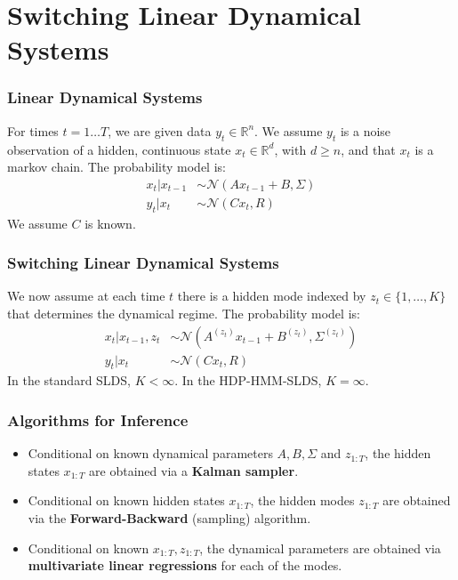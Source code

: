 \documentclass{beamer}
\begin{document}
\section{Switching Linear Dynamical Systems}
\begin{frame}
\frametitle{Linear Dynamical Systems}

For times $t=1\ldots T$, we are given data $y_t\in\mathbb{R}^n$. We assume $y_t$ is a noise observation of a hidden, continuous state $x_t\in\mathbb{R}^d$, with $d\geq n$, and that $x_t$ is a markov chain. The probability model is:
\begin{align*}
x_t|x_{t-1}&\sim\mathcal{N}(Ax_{t-1}+B,\Sigma)\\
y_t|x_t&\sim\mathcal{N}(Cx_t,R)
\end{align*}
We assume $C$ is known.

\end{frame}

\begin{frame}
\frametitle{Switching Linear Dynamical Systems}

We now assume at each time $t$ there is a hidden mode indexed by $z_t\in\{1,\ldots,K\}$ that determines the dynamical regime. The probability model is:
\begin{align*}
x_t|x_{t-1},z_t&\sim\mathcal{N}(A^{(z_t)}x_{t-1}+B^{(z_t)},\Sigma^{(z_t)})\\
y_t|x_t&\sim\mathcal{N}(Cx_t,R)
\end{align*}
In the standard SLDS, $K<\infty$. In the HDP-HMM-SLDS, $K=\infty$.
\end{frame}

\begin{frame}
\frametitle{Algorithms for Inference}
\begin{itemize}
\item Conditional on known dynamical parameters $A,B,\Sigma$ and $z_{1:T}$, the hidden states $x_{1:T}$ are obtained via a \textbf{Kalman sampler}.
\item Conditional on known hidden states $x_{1:T}$, the hidden modes $z_{1:T}$ are obtained via the \textbf{Forward-Backward} (sampling) algorithm.
\item Conditional on known $x_{1:T},z_{1:T}$, the dynamical parameters are obtained via \textbf{multivariate linear regressions} for each of the modes.
\end{itemize}
\end{frame}
\end{document}

